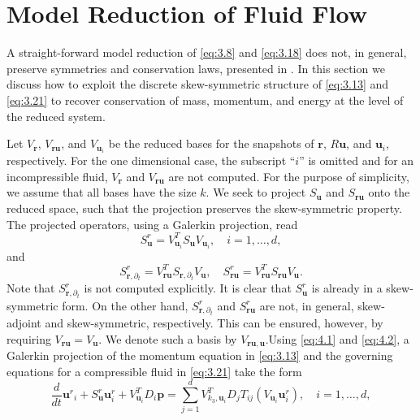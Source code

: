 \section{Model Reduction of Fluid Flow} \label{sec:mor_skew}
A straight-forward model reduction of \eqref{eq:3.8} and \eqref{eq:3.18} does not, in general, preserve symmetries and conservation laws, presented in . In this section we discuss how to exploit the discrete skew-symmetric structure of \eqref{eq:3.13} and \eqref{eq:3.21} to recover conservation of mass, momentum, and energy at the level of the reduced system.

Let $V_{\mathbf r}$, $V_{\mathbf r \mathbf u}$, and $V_{\mathbf u_i}$ be the reduced bases for the snapshots of $\mathbf r$, $R \mathbf u$, and $\mathbf u_i$, respectively. For the one dimensional case, the subscript ``$i$'' is omitted and for an incompressible fluid, $V_{ \mathbf r}$ and $V_{\mathbf r \mathbf u}$ are not computed. For the purpose of simplicity, we assume that all bases have the size $k$. We seek to project $S_{\mathbf u}$ and $S_{\mathbf r \mathbf u}$ onto the reduced space, such that the projection preserves the skew-symmetric property. The projected operators, using a Galerkin projection, read
\begin{equation} \label{eq:4.1}
	S^r _{\mathbf u} = V_{ \mathbf u_i}^T S _{\mathbf u} V_{ \mathbf u_i}, \quad i=1,\dots,d,
\end{equation}
and
\begin{equation} \label{eq:4.2}
	S^r_{\mathbf r ,\partial_t} =V_{\mathbf r \mathbf u}^T  S_{\mathbf r ,\partial_t} V_{\mathbf u}, \quad S^r _{\mathbf r \mathbf u} = V_{\mathbf r \mathbf u}^T  S _{\mathbf r \mathbf u} V_{\mathbf u}.
\end{equation}
Note that $S^r_{\mathbf r ,\partial_t}$ is not computed explicitly. It is clear that $S^r _{\mathbf u}$ is already in a skew-symmetric form. On the other hand, $S^r_{\mathbf r ,\partial_t}$ and $S^r _{\mathbf r \mathbf u}$ are not, in general, skew-adjoint and skew-symmetric, respectively. This can be ensured, however, by requiring $V_{\mathbf r \mathbf u} = V_{\mathbf u}$. We denote such a basis by $V_{\mathbf r \mathbf u, \mathbf u}$.Using \eqref{eq:4.1} and \eqref{eq:4.2}, a Galerkin projection of the momentum equation in \eqref{eq:3.13} and the governing equations for a compressible fluid in \eqref{eq:3.21} take the form
\begin{equation} \label{eq:4.3}
	\frac{d}{dt} {\mathbf u^r}_i + S^r_{\mathbf u} \mathbf u^r_i + V_{\mathbf u_i} ^T D_i \mathbf p = \sum_{j=1}^d V_{k_3, \mathbf u_i}^T D_j T_{ij}(V_{ \mathbf u_i} \mathbf u^r_i), \quad i=1,\dots,d,
\end{equation}
